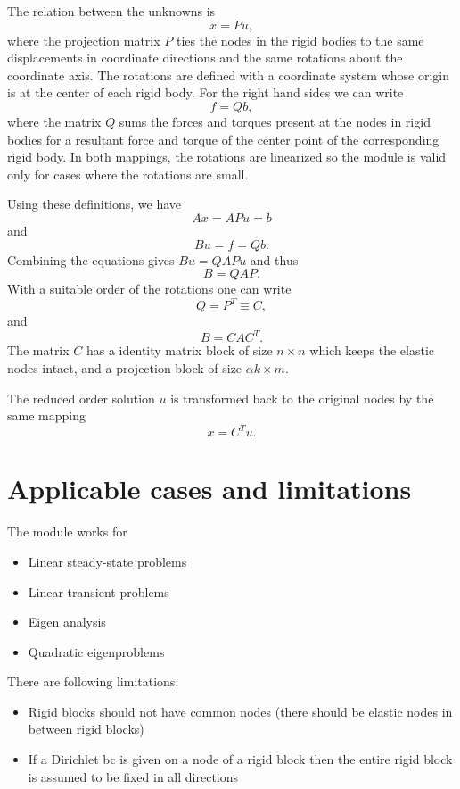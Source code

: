 The relation between the unknowns is 
\begin{equation}
x = Pu,
\end{equation}
where the projection matrix $P$ ties the nodes in the rigid bodies to
the same displacements in coordinate directions and the same rotations
about the coordinate axis. The rotations are defined with a coordinate
system whose origin is at the center of each rigid body.  For the right
hand sides we can write
\begin{equation}
f = Qb,
\end{equation}
where the matrix $Q$ sums the forces and torques present at the nodes
in rigid bodies for a resultant force and torque of the center point
of the corresponding rigid body. In both mappings, the rotations are
linearized so the module is valid only for cases where the rotations
are small.

Using these definitions, we have
\begin{equation}
Ax=APu=b
\end{equation}
and
\begin{equation}
Bu=f=Qb.
\end{equation}
Combining the equations gives $Bu=QAPu$ and thus
\begin{equation}
B = QAP.
\end{equation}
With a suitable order of the rotations one can write 
\begin{equation}
Q=P^T \equiv C,
\end{equation}
and
\begin{equation}
B = CAC^T.
\end{equation}
The matrix $C$ has a identity matrix block of size $n\times n$ which
keeps the elastic nodes intact, and a projection block of size
$\alpha k\times m$. 

The reduced order solution $u$ is transformed back to the original
nodes by the same mapping
\begin{equation}
x=C^T u.
\end{equation}


\section{Applicable cases and limitations}

The module works for
\begin{itemize}
\item Linear steady-state problems
\item Linear transient problems
\item Eigen analysis
\item Quadratic eigenproblems
\end{itemize}
%
There are following limitations:
\begin{itemize}
\item Rigid blocks should not have common nodes (there should be
elastic nodes in between rigid blocks)
\item If a Dirichlet bc is given on a node of a rigid block then the
entire rigid block is assumed to be fixed in all directions
\end{itemize}


